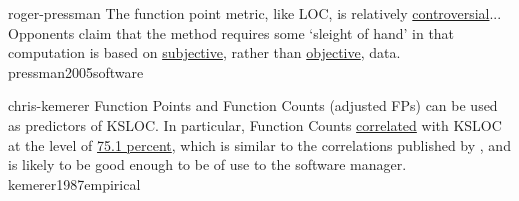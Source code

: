 \documentclass{article}
\begin{document}

\qte
  {roger-pressman}
  {The function point metric, like LOC, is relatively \ul{controversial}... Opponents claim that the method requires some `sleight of hand' in that computation is based on \ul{subjective}, rather than \ul{objective}, data.}
  {pressman2005software}

\qte
  {chris-kemerer}
  {Function Points and Function Counts (adjusted FPs) can be used as predictors of KSLOC. In particular, Function Counts \ul{correlated} with KSLOC at the level of \ul{75.1 percent}, which is similar to the correlations published by \citet{albrecht1983software}, and is likely to be good enough to be of use to the software manager.}
  {kemerer1987empirical}
\end{document}
